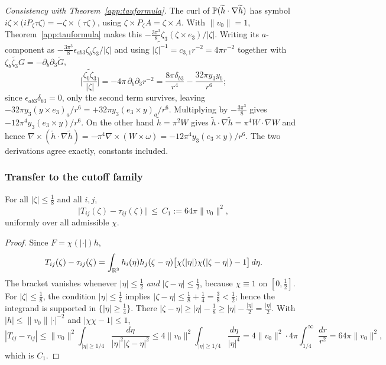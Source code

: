 \begin{remark}
\emph{Consistency with Theorem~\ref{app:tauformula}.} The curl of
$\mathbb P(\widetilde h\cdot\nabla\widetilde h)$ has symbol
$i\zeta\times\big(iP_\zeta\tau\zeta\big)=-\zeta\times(\tau\zeta)$, using
$\zeta\times P_\zeta A=\zeta\times A$. With $\|v_0\|=1$,
Theorem~\ref{app:tauformula} makes this
$-\frac{3\pi^{3}}{8}\zeta_3(\zeta\times e_3)/|\zeta|$. Writing its
$a$-component as $-\frac{3\pi^3}{8}\epsilon_{ab3}\zeta_b\zeta_3/|\zeta|$
and using $\widetilde{|\zeta|^{-1}}=c_{3,1}r^{-2}=4\pi r^{-2}$ together
with $\widetilde{\zeta_b\zeta_3G}=-\partial_b\partial_3\widetilde G$,
\[
\widetilde{\Big[\frac{\zeta_b\zeta_3}{|\zeta|}\Big]}
=-4\pi\,\partial_b\partial_3r^{-2}
=\frac{8\pi\delta_{b3}}{r^{4}}-\frac{32\pi y_3y_b}{r^{6}} ;
\]
since $\epsilon_{ab3}\delta_{b3}=0$, only the second term survives,
leaving $-32\pi y_3(y\times e_3)_a/r^{6}
=+32\pi y_3(e_3\times y)_a/r^{6}$. Multiplying by
$-\frac{3\pi^{3}}{8}$ gives $-12\pi^{4}y_3(e_3\times y)/r^{6}$. On the
other hand $\widetilde h=\pi^2W$ gives
$\widetilde h\cdot\nabla\widetilde h=\pi^{4}W\cdot\nabla W$ and hence
$\nabla\times(\widetilde h\cdot\nabla\widetilde h)
=-\pi^{4}\nabla\times(W\times\omega)
=-12\pi^{4}y_3(e_3\times y)/r^{6}$. The two derivations agree exactly,
constants included.
\end{remark}

\subsubsection*{Transfer to the cutoff family}

\begin{lemma}[the cutoff perturbation is bounded near $\zeta=0$]
\label{app:perturb}
For all $|\zeta|\le\frac18$ and all $i,j$,
\[
\big|T_{ij}(\zeta)-\tau_{ij}(\zeta)\big|\ \le\ C_1:=64\pi\|v_0\|^{2},
\]
uniformly over all admissible $\chi$.
\end{lemma}

\begin{proof}
Since $F=\chi(|\cdot|)h$,
\[
T_{ij}(\zeta)-\tau_{ij}(\zeta)
=\int_{\mathbb R^3}h_i(\eta)h_j(\zeta-\eta)
\big[\chi(|\eta|)\chi(|\zeta-\eta|)-1\big]\,d\eta .
\]
The bracket vanishes whenever $|\eta|\le\frac12$ \emph{and}
$|\zeta-\eta|\le\frac12$, because $\chi\equiv1$ on $[0,\frac12]$. For
$|\zeta|\le\frac18$, the condition $|\eta|\le\frac14$ implies
$|\zeta-\eta|\le\frac18+\frac14=\frac38<\frac12$; hence the integrand is
supported in $\{|\eta|\ge\frac14\}$. There
$|\zeta-\eta|\ge|\eta|-\frac18\ge|\eta|-\frac{|\eta|}{2}
=\frac{|\eta|}{2}$. With $|h|\le\|v_0\||\cdot|^{-2}$ and
$|\chi\chi-1|\le1$,
\[
|T_{ij}-\tau_{ij}|
\le\|v_0\|^{2}\int_{|\eta|\ge1/4}\frac{d\eta}{|\eta|^{2}|\zeta-\eta|^{2}}
\le4\|v_0\|^{2}\int_{|\eta|\ge1/4}\frac{d\eta}{|\eta|^{4}}
=4\|v_0\|^{2}\cdot4\pi\int_{1/4}^{\infty}\frac{dr}{r^{2}}
=64\pi\|v_0\|^{2},
\]
which is $C_1$.
\end{proof}

